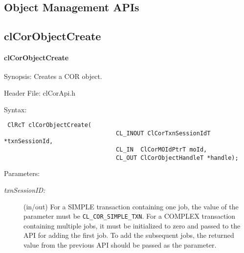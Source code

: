 \begin{flushleft}
\section{Object Management APIs}
\subsection{clCorObjectCreate}
\hypertarget{pagecor100}{}\paragraph{cl\-Cor\-Object\-Create}\label{pagecor100}
\begin{Desc}
\item[Synopsis:]Creates a COR object.\end{Desc}
\begin{Desc}
\item[Header File:]clCorApi.h\end{Desc}
\begin{Desc}
\item[Syntax:]

\footnotesize\begin{verbatim} ClRcT clCorObjectCreate(
                           		CL_INOUT ClCorTxnSessionIdT *txnSessionId,
                           		CL_IN  ClCorMOIdPtrT moId,
                           		CL_OUT ClCorObjectHandleT *handle);
\end{verbatim}
\normalsize
\end{Desc}
\begin{Desc}
\item[Parameters:]
\begin{description}
\item[{\em txn\-Session\-ID:}] (in/out) For a SIMPLE transaction containing one job, the value of the parameter must be {\tt{CL\_\-COR\_\-SIMPLE\_\-TXN}}.
For a COMPLEX transaction containing multiple jobs, it must be initialized to zero and passed to the API for adding the first job. To add the subsequent
jobs, the returned value from the previous API should be passed as the parameter.
 

\end{description}
\end{Desc}
\end{flushleft}

